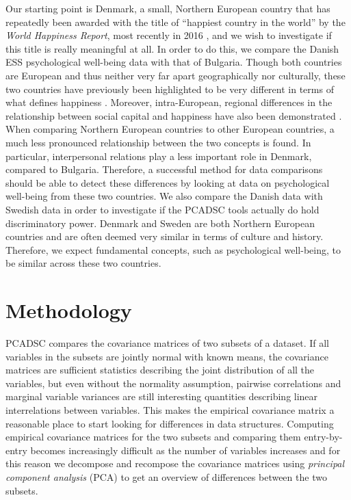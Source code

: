 \documentclass[]{interact}
\theoremstyle{plain}%
\theoremstyle{definition}
\theoremstyle{remark}
\begin{document}
Our starting point is Denmark, a small, Northern European country that has repeatedly been awarded with the title of ``happiest country in the world''  by the \textit{World Happiness Report}, most recently in 2016 \cite{WHR2016}, and we wish to investigate if this title is really meaningful at all. In order to do this, we compare the Danish ESS psychological well-being data with that of Bulgaria. Though both countries are European and thus neither very far apart geographically nor culturally, these two countries have previously been highlighted to be very different in terms of what defines happiness \cite{ESStopline5}. Moreover, intra-European, regional differences in the relationship between social capital and happiness have also been demonstrated \cite{Rodriguez2014}. When comparing Northern European countries to other European countries, a much less pronounced relationship between the two concepts is found. In particular, interpersonal relations play a less important role in Denmark, compared to Bulgaria. Therefore, a successful method for data comparisons should be able to detect these differences by looking at data on psychological well-being from these two countries. We also compare the Danish data with Swedish data in order to investigate if the PCADSC tools actually do hold discriminatory power. Denmark and Sweden are both Northern European countries and are often deemed very similar in terms of culture and history. Therefore, we expect fundamental concepts, such as psychological well-being, to be similar across these two countries.




\section{Methodology}\label{sec:pcadscintro}


PCADSC compares the covariance matrices of two subsets of a dataset. If all variables in the subsets are jointly normal with known means, the covariance matrices are sufficient statistics describing the joint distribution of all the variables, but even without the normality assumption, pairwise correlations and marginal variable variances are still interesting quantities describing linear interrelations between variables. This makes the empirical covariance matrix a reasonable place to start looking for differences in data structures. Computing empirical covariance matrices for the two subsets and comparing them entry-by-entry becomes increasingly difficult as the number of variables increases and for this reason we decompose and recompose the covariance matrices using \textit{principal component analysis} (PCA) to get an overview of differences between the two subsets. %
\end{document}
